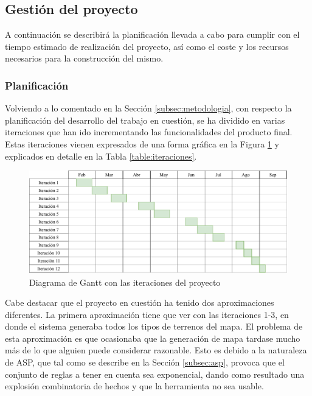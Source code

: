 \subsection{Gestión del proyecto}
\label{subsec:gestion}

A continuación se describirá la planificación llevada a cabo para cumplir con el tiempo estimado de realización del proyecto, así como el coste y los recursos necesarios para la construcción del mismo.

\subsubsection{Planificación}

Volviendo a lo comentado en la Sección \ref{subsec:metodologia}, con respecto la planificación del desarrollo del trabajo en cuestión, se ha dividido en varias iteraciones que han ido incrementando las funcionalidades del producto final. Estas iteraciones vienen expresados de una forma gráfica en la Figura \ref{fig:gantt} y explicados en detalle en la Tabla \ref{table:iteraciones}.

\begin{figure}[!h]
	\centering
	\includegraphics[width=\textwidth]{images/gantt.pdf}
	\caption{Diagrama de Gantt con las iteraciones del proyecto}
	\label{fig:gantt}
\end{figure}

Cabe destacar que el proyecto en cuestión ha tenido dos aproximaciones diferentes. La primera aproximación tiene que ver con las iteraciones 1-3, en donde el sistema generaba todos los tipos de terrenos del mapa. El problema de esta aproximación es que ocasionaba que la generación de mapa tardase mucho más de lo que alguien puede considerar razonable. Esto es debido a la naturaleza de ASP, que tal como se describe en la Sección \ref{subsec:asp}, provoca que el conjunto de reglas a tener en cuenta sea exponencial, dando como resultado una explosión combinatoria de hechos y que la herramienta no sea usable. \\

